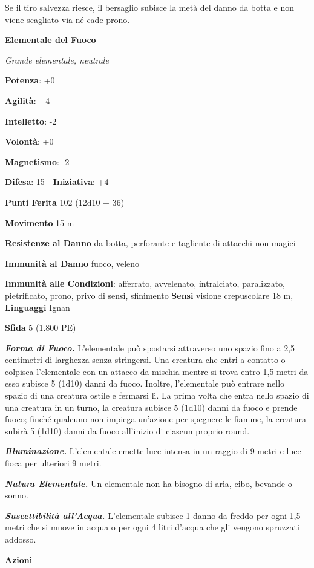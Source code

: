 \begin{multicols}{2}
Se il tiro salvezza riesce, il bersaglio subisce la metà del danno
da botta e non viene scagliato via né cade prono.

\textbf{Elementale del Fuoco}

\emph{Grande elementale, neutrale}

\textbf{Potenza}: +0

\textbf{Agilità}: +4

\textbf{Intelletto}: -2

\textbf{Volontà}: +0

\textbf{Magnetismo}: -2

\textbf{Difesa}: 15 - \textbf{Iniziativa}: +4

\textbf{Punti Ferita} 102 (12d10 + 36)

\textbf{Movimento} 15 m

\textbf{Resistenze al Danno} da botta, perforante e tagliente di
attacchi non magici

\textbf{Immunità al Danno} fuoco, veleno

\textbf{Immunità alle Condizioni}: afferrato, avvelenato, intralciato,
paralizzato, pietrificato, prono, privo di sensi, sfinimento
\textbf{Sensi} visione crepuscolare 18 m, 
\textbf{Linguaggi} Ignan

\textbf{Sfida} 5 (1.800 PE)\smallskip

\emph{\textbf{Forma di Fuoco.}} L'elementale può spostarsi attraverso
uno spazio fino a 2,5 centimetri di larghezza senza stringersi. Una
creatura che entri a contatto o colpisca l'elementale con un attacco da
mischia mentre si trova entro 1,5 metri da esso subisce 5 (1d10) danni
da fuoco. Inoltre, l'elementale può entrare nello spazio di una creatura
ostile e fermarsi lì. La prima volta che entra nello spazio di una
creatura in un turno, la creatura subisce 5 (1d10) danni da fuoco e
prende fuoco; finché qualcuno non impiega un'azione per spegnere le
fiamme, la creatura subirà 5 (1d10) danni da fuoco all'inizio di ciascun
proprio round.

\emph{\textbf{Illuminazione.}} L'elementale emette luce intensa in un
raggio di 9 metri e luce fioca per ulteriori 9 metri.

\emph{\textbf{Natura Elementale.}} Un elementale non ha bisogno di aria,
cibo, bevande o sonno.

\emph{\textbf{Suscettibilità all'Acqua.}} L'elementale subisce 1 danno
da freddo per ogni 1,5 metri che si muove in acqua o per ogni 4 litri
d'acqua che gli vengono spruzzati addosso.

\smallskip\textbf{Azioni}


\end{multicols}
